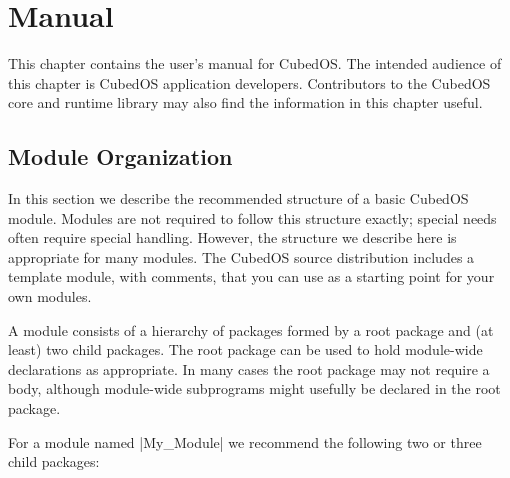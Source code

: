 
\chapter{Manual}
\label{chapt:manual}

This chapter contains the user's manual for CubedOS. The intended audience of this chapter is
CubedOS application developers. Contributors to the CubedOS core and runtime library may also
find the information in this chapter useful.

\section{Module Organization}
\label{sec:module-organization}

In this section we describe the recommended structure of a basic CubedOS module. Modules are not
required to follow this structure exactly; special needs often require special handling.
However, the structure we describe here is appropriate for many modules. The CubedOS source
distribution includes a template module, with comments, that you can use as a starting point for
your own modules.

A module consists of a hierarchy of packages formed by a root package and (at least) two child
packages. The root package can be used to hold module-wide declarations as appropriate. In many
cases the root package may not require a body, although module-wide subprograms might usefully
be declared in the root package.

For a module named |My_Module| we recommend the following two or three child packages:

